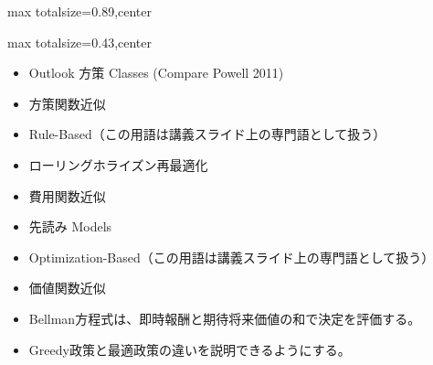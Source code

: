 \begin{minipage}[t]{0.58\textwidth}
\begin{adjustbox}{max totalsize={\textwidth}{0.89\textheight},center}
\begin{minipage}{\textwidth}
\end{minipage}
\end{adjustbox}
\end{minipage}


\clearpage
{}
\begin{minipage}[t]{0.405\textwidth}
\begin{adjustbox}{max totalsize={\textwidth}{0.43\textheight},center}
\begin{minipage}{\textwidth}\scriptsize
{}\begin{itemize}
\item Outlook 方策 Classes (Compare Powell 2011)
\item 方策関数近似
\item Rule-Based（この用語は講義スライド上の専門語として扱う）
\item ローリングホライズン再最適化
\item 費用関数近似
\item 先読み Models
\item Optimization-Based（この用語は講義スライド上の専門語として扱う）
\item 価値関数近似
\end{itemize}\begin{itemize}
\item Bellman方程式は、即時報酬と期待将来価値の和で決定を評価する。
\item Greedy政策と最適政策の違いを説明できるようにする。
\end{itemize}
\end{minipage}
\end{adjustbox}
\end{minipage}\hfill
